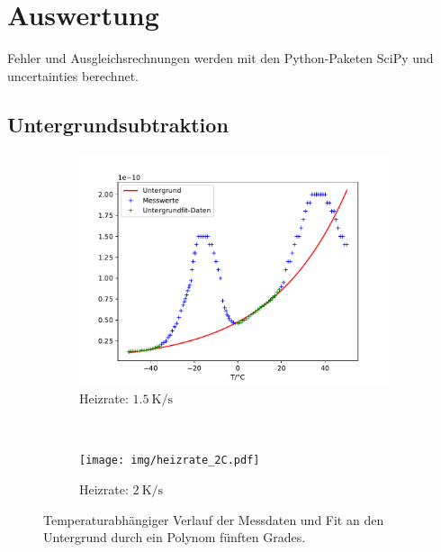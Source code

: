 \section{Auswertung}

Fehler und Ausgleichsrechnungen werden mit den Python-Paketen SciPy \cite{scipy} und uncertainties \cite{uncertain} berechnet.

\subsection{Untergrundsubtraktion}

\begin{figure}[htp]
    \centering
    \begin{subfigure}[t]{0.5\textwidth}
        \centering
        \includegraphics[width=\textwidth]{img/heizrate_15C.pdf}
        \caption{Heizrate: $\SI{1.5}{\kelvin\per\second}$}
    \end{subfigure}%
    ~
    \begin{subfigure}[t]{0.5\textwidth}
        \centering
        \texttt{[image: img/heizrate\_2C.pdf]}
        \caption{Heizrate: $\SI{2}{\kelvin\per\second}$}
    \end{subfigure}
    \caption{Temperaturabhängiger Verlauf der Messdaten und Fit an den Untergrund durch ein Polynom fünften Grades.}
\end{figure}


